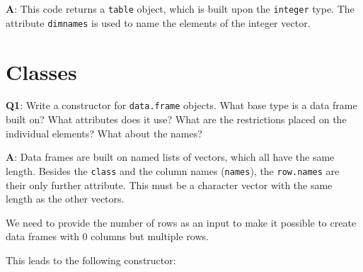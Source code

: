 \documentclass[
]{krantz}
\makeatletter
\newenvironment{Shaded}{\begin{snugshade}}{\end{snugshade}}
\newcommand{\CommentTok}[1]{\textcolor[rgb]{0.56,0.35,0.01}{\textit{#1}}}
\newcommand{\KeywordTok}[1]{\textcolor[rgb]{0.13,0.29,0.53}{\textbf{#1}}}
\newcommand{\NormalTok}[1]{#1}
\newenvironment{kframe}{%
\medskip{}
\setlength{\fboxsep}{.8em}
 \def\at@end@of@kframe{}%
 \ifinner\ifhmode%
  \def\at@end@of@kframe{\end{minipage}}%
  \begin{minipage}{\columnwidth}%
 \fi\fi%
 \def\FrameCommand##1{\hskip\@totalleftmargin \hskip-\fboxsep
 \colorbox{shadecolor}{##1}\hskip-\fboxsep
     \hskip-\linewidth \hskip-\@totalleftmargin \hskip\columnwidth}%
 \MakeFramed {\advance\hsize-\width
   \@totalleftmargin\z@ \linewidth\hsize
   \@setminipage}}%
 {\par\unskip\endMakeFramed%
 \at@end@of@kframe}
\renewenvironment{Shaded}{\begin{kframe}}{\end{kframe}}
\renewcommand{\KeywordTok} [1]{\textcolor[rgb]{0.00,0.44,0.13}{{#1}}}
\renewcommand{\CommentTok} [1]{\textcolor[rgb]{0.38,0.63,0.69}{{#1}}}
\renewcommand{\NormalTok}  [1]{{#1}}
\makeatother
\begin{document}
\textbf{{A}}: This code returns a \texttt{table} object, which is built upon the \texttt{integer} type. The attribute \texttt{dimnames} is used to name the elements of the integer vector.

\begin{Shaded}
\end{Shaded}

\hypertarget{classes}{%
\section{Classes}\label{classes}}

\textbf{{Q1}}: Write a constructor for \texttt{data.frame} objects. What base type is a data frame built on? What attributes does it use? What are the restrictions placed on the individual elements? What about the names?

\textbf{{A}}: Data frames are built on named lists of vectors, which all have the same length. Besides the \texttt{class} and the column names (\texttt{names}), the \texttt{row.names} are their only further attribute. This must be a character vector with the same length as the other vectors.

We need to provide the number of rows as an input to make it possible to create data frames with 0 columns but multiple rows.

This leads to the following constructor:
\end{document}
